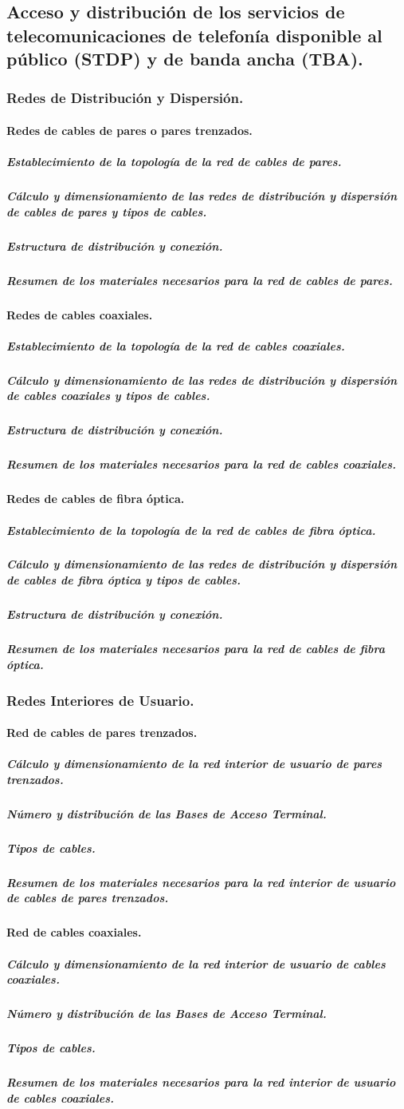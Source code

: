 \subsection{Acceso y distribución de los servicios de telecomunicaciones de telefonía disponible al público (STDP) y de banda ancha (TBA).}
\subsubsection{Redes de Distribución y Dispersión.}
\paragraph{Redes de cables de pares o pares trenzados.}
\subparagraph{Establecimiento de la topología de la red de cables de pares.}
\subparagraph{Cálculo y dimensionamiento de las redes de distribución y dispersión de cables de pares y tipos de cables.}
\subparagraph{Estructura de distribución y conexión.}
\subparagraph{Resumen de los materiales necesarios para la red de cables de pares.}
\paragraph{Redes de cables coaxiales.}
\subparagraph{Establecimiento de la topología de la red de cables coaxiales.}
\subparagraph{Cálculo y dimensionamiento de las redes de distribución y dispersión de cables coaxiales y tipos de cables.}
\subparagraph{Estructura de distribución y conexión.}
\subparagraph{Resumen de los materiales necesarios para la red de cables coaxiales.}
\paragraph{Redes de cables de fibra óptica.}
\subparagraph{Establecimiento de la topología de la red de cables de fibra óptica.}
\subparagraph{Cálculo y dimensionamiento de las redes de distribución y dispersión de cables de fibra óptica y tipos de cables.}
\subparagraph{Estructura de distribución y conexión.}
\subparagraph{Resumen de los materiales necesarios para la red de cables de fibra óptica.}
\subsubsection{Redes Interiores de Usuario.}
\paragraph{Red de cables de pares trenzados.}
\subparagraph{Cálculo y dimensionamiento de la red interior de usuario de pares trenzados.}
\subparagraph{Número y distribución de las Bases de Acceso Terminal.}
\subparagraph{Tipos de cables.}
\subparagraph{Resumen de los materiales necesarios para la red interior de usuario de cables de pares trenzados.}
\paragraph{Red de cables coaxiales.}
\subparagraph{Cálculo y dimensionamiento de la red interior de usuario de cables coaxiales.}
\subparagraph{Número y distribución de las Bases de Acceso Terminal.}
\subparagraph{Tipos de cables.}
\subparagraph{Resumen de los materiales necesarios para la red interior de usuario de cables coaxiales.}